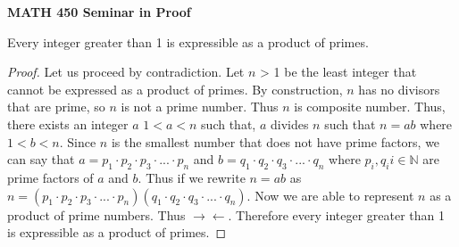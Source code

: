 \documentclass[12pt, fullpage]{article}
\newcommand{\N}{\mathbb N}
\begin{document}
\begin{center}
		
{\bf MATH 450 Seminar in Proof}
 \\
\end{center}
	Every integer greater than 1 is expressible as a product of primes.
\begin{proof}
	Let us proceed by contradiction. Let $n$ > 1 be the least integer that cannot be expressed as a product of primes. By construction, $n$ has no divisors that are prime, so $n$ is not a prime number. Thus $n$ is composite number. Thus, there exists an integer $a$ $1 < a < n$ such that, $a$ divides $n$ such that $n = ab$ where $1<b<n$. Since $n$ is the smallest number that does not have prime factors, we can say that $a = p_1 \cdot p_2 \cdot p_3 \cdot ... \cdot p_n$ and $b = q_1 \cdot q_2 \cdot q_3 \cdot ... \cdot q_n$ where $p_i, q_i i \in \N$ are prime factors of $a$ and $b$. Thus if we rewrite $n = ab$ as $n = (p_1 \cdot p_2 \cdot p_3 \cdot ... \cdot p_n)(q_1 \cdot q_2 \cdot q_3 \cdot ... \cdot q_n)$. Now we are able to represent $n$ as a product of prime numbers. Thus $\rightarrow\leftarrow$. Therefore every integer greater than 1 is expressible as a product of primes.
\end{proof}
\end{document}
